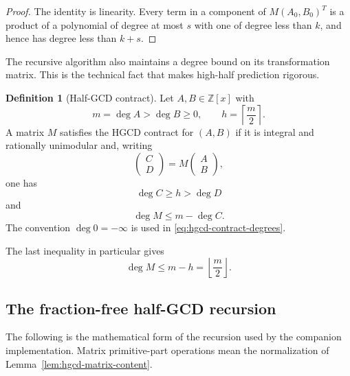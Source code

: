 \documentclass[11pt]{book}
\theoremstyle{definition}
\newtheorem{definition}[theorem]{Definition}
\newcommand{\ZZ}{\mathbb Z}
\begin{document}
\begin{proof}
The identity is linearity.  Every term in a component of
$M(A_0,B_0)^T$ is a product of a polynomial of degree at most $s$ with one of
degree less than $k$, and hence has degree less than $k+s$.
\end{proof}

The recursive algorithm also maintains a degree bound on its transformation
matrix.  This is the technical fact that makes high-half prediction rigorous.

\begin{definition}[Half-GCD contract]\label{def:hgcd-contract}
Let $A,B\in\ZZ[x]$ with
\[
 m=\deg A>\deg B\ge0,
 \qquad
 h=\left\lceil\frac m2\right\rceil.
\]
A matrix $M$ satisfies the HGCD contract for $(A,B)$ if it is integral and
rationally unimodular and, writing
\[
 \begin{pmatrix}C\\D\end{pmatrix}
 =M\begin{pmatrix}A\\B\end{pmatrix},
\]
one has
\begin{equation}\label{eq:hgcd-contract-degrees}
 \deg C\ge h>\deg D
\end{equation}
and
\begin{equation}\label{eq:hgcd-contract-matrix-degree}
 \deg M\le m-\deg C.
\end{equation}
The convention $\deg0=-\infty$ is used in
\eqref{eq:hgcd-contract-degrees}.
\end{definition}

The last inequality in particular gives
\[
 \deg M\le m-h=\left\lfloor\frac m2\right\rfloor.
\]

\subsection{The fraction-free half-GCD recursion}

The following is the mathematical form of the recursion used by the companion
implementation.  Matrix primitive-part operations mean the normalization of
Lemma~\ref{lem:hgcd-matrix-content}.
\end{document}
